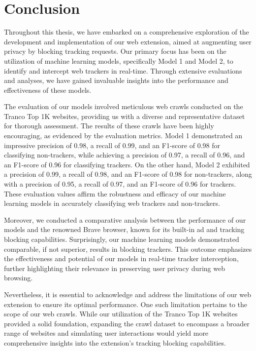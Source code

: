 \chapter{Conclusion}
\label{cha:conclusion}
Throughout this thesis, we have embarked on a comprehensive exploration of the development and implementation of our web extension,
aimed at augmenting user privacy by blocking tracking requests. Our primary focus has been on the utilization of machine learning
models, specifically Model 1 and Model 2, to identify and intercept web trackers in real-time. Through extensive evaluations
and analyses, we have gained invaluable insights into the performance and effectiveness of these models.

The evaluation of our models involved meticulous web crawls conducted on the Tranco Top 1K websites, providing us with a diverse
and representative dataset for thorough assessment. The results of these crawls have been highly encouraging, as evidenced by the
evaluation metrics. Model 1 demonstrated an impressive precision of 0.98, a recall of 0.99, and an F1-score of 0.98 for classifying
non-trackers, while achieving a precision of 0.97, a recall of 0.96, and an F1-score of 0.96 for classifying trackers. On the other
hand, Model 2 exhibited a precision of 0.99, a recall of 0.98, and an F1-score of 0.98 for non-trackers, along with a precision of 0.95,
a recall of 0.97, and an F1-score of 0.96 for trackers. These evaluation values affirm the robustness and efficacy of our machine
learning models in accurately classifying web trackers and non-trackers.

Moreover, we conducted a comparative analysis between the performance of our models and the renowned Brave browser, known for its
built-in ad and tracking blocking capabilities. Surprisingly, our machine learning models demonstrated comparable, if not superior,
results in blocking trackers. This outcome emphasizes the effectiveness and potential of our models in real-time tracker interception,
further highlighting their relevance in preserving user privacy during web browsing.

Nevertheless, it is essential to acknowledge and address the limitations of our web extension to ensure its optimal performance.
One such limitation pertains to the scope of our web crawls. While our utilization of the Tranco Top 1K websites provided a solid
foundation, expanding the crawl dataset to encompass a broader range of websites and simulating user interactions would yield more
comprehensive insights into the extension's tracking blocking capabilities.

